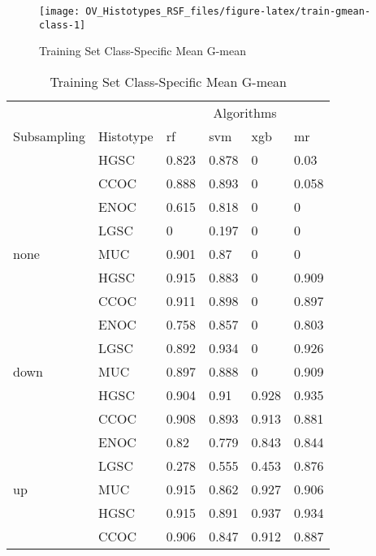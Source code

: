 \documentclass[
]{report}
\begin{document}
\begin{figure}[H]

{\centering \texttt{[image: OV\_Histotypes\_RSF\_files/figure-latex/train-gmean-class-1]} 

}

\caption{Training Set Class-Specific Mean G-mean}\label{fig:train-gmean-class}
\end{figure}

\begin{table}

\caption{\label{tab:train-gmean-class-table}Training Set Class-Specific Mean G-mean}
\centering
\begin{tabular}[t]{l|l|l|l|l|l}
\hline
\multicolumn{2}{c|}{ } & \multicolumn{4}{c}{Algorithms} \\
\cline{3-6}
Subsampling & Histotype & rf & svm & xgb & mr\\
\hline
 & HGSC & 0.823 & 0.878 & 0 & 0.03\\
\cline{2-6}
 & CCOC & 0.888 & 0.893 & 0 & 0.058\\
\cline{2-6}
 & ENOC & 0.615 & 0.818 & 0 & 0\\
\cline{2-6}
 & LGSC & 0 & 0.197 & 0 & 0\\
\cline{2-6}
\multirow{-5}{*}{\raggedright\arraybackslash none} & MUC & 0.901 & 0.87 & 0 & 0\\
\cline{1-6}
 & HGSC & 0.915 & 0.883 & 0 & 0.909\\
\cline{2-6}
 & CCOC & 0.911 & 0.898 & 0 & 0.897\\
\cline{2-6}
 & ENOC & 0.758 & 0.857 & 0 & 0.803\\
\cline{2-6}
 & LGSC & 0.892 & 0.934 & 0 & 0.926\\
\cline{2-6}
\multirow{-5}{*}{\raggedright\arraybackslash down} & MUC & 0.897 & 0.888 & 0 & 0.909\\
\cline{1-6}
 & HGSC & 0.904 & 0.91 & 0.928 & 0.935\\
\cline{2-6}
 & CCOC & 0.908 & 0.893 & 0.913 & 0.881\\
\cline{2-6}
 & ENOC & 0.82 & 0.779 & 0.843 & 0.844\\
\cline{2-6}
 & LGSC & 0.278 & 0.555 & 0.453 & 0.876\\
\cline{2-6}
\multirow{-5}{*}{\raggedright\arraybackslash up} & MUC & 0.915 & 0.862 & 0.927 & 0.906\\
\cline{1-6}
 & HGSC & 0.915 & 0.891 & 0.937 & 0.934\\
\cline{2-6}
 & CCOC & 0.906 & 0.847 & 0.912 & 0.887\\
\cline{2-6}

\end{tabular}
\end{table}
\end{document}
